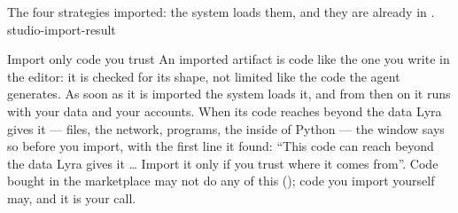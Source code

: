   {The four strategies imported: the system loads them, and they are already
   in .}
  {studio-import-result}

\begin{attenzione}{Import only code you trust}
An imported artifact is code like the one you write in the editor: it is
checked for its shape, not limited like the code the agent generates. As soon
as it is imported the system loads it, and from then on it runs with your
data and your accounts. When its code reaches beyond the data Lyra gives it
--- files, the network, programs, the inside of Python --- the window says
so before you import, with the first line it found: \enquote{This code can
reach beyond the data Lyra gives it \ldots{} Import it only if you trust
where it comes from}. Code bought in the marketplace may not do any of this
(); code you import yourself may, and it is your call.
\end{attenzione}

